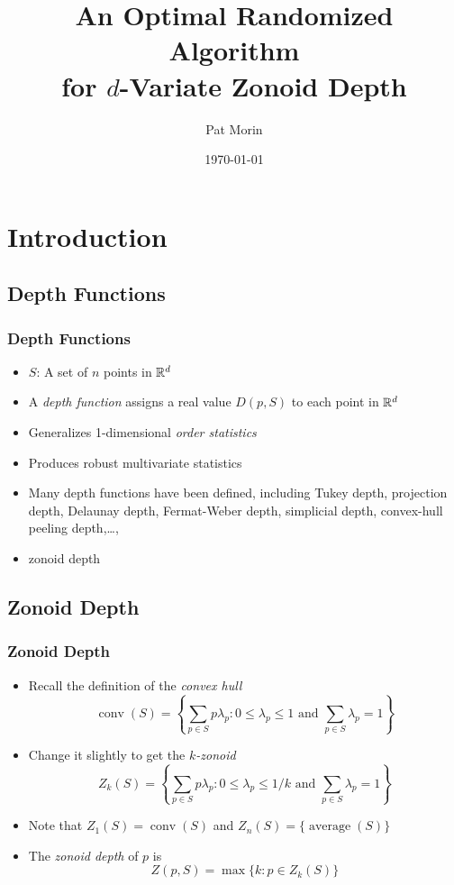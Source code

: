 \documentclass{beamer}
\title{An Optimal Randomized Algorithm \\ for $d$-Variate Zonoid Depth}
\author{Pat Morin}
\date{\today}
\DeclareMathOperator{\conv}{conv}
\DeclareMathOperator{\average}{average}
\begin{document}
\frame{\titlepage}

\section[Outline]{}
\frame{\tableofcontents}

\section{Introduction}
\subsection{Depth Functions}
\frame
{
  \frametitle{Depth Functions}
  \begin{itemize}
  \item $S$: A set of $n$ points in $\mathbb{R}^d$
  \item A \emph{depth function} assigns a real value $D(p,S)$ to 
            each point in $\mathbb{R}^d$
  \item Generalizes 1-dimensional \emph{order statistics} 
  \item Produces robust multivariate statistics
  \item Many depth functions have been defined, including Tukey depth,
projection depth, Delaunay depth, Fermat-Weber depth, simplicial
depth, convex-hull peeling depth,\ldots,
  \item<1->zonoid depth
  \end{itemize}
}
    
\subsection{Zonoid Depth}
\frame
{
   \frametitle{Zonoid Depth}
   \begin{itemize}
   \item<1-> Recall the definition of the \emph{convex hull}
    \[ \conv(S) = \left\{\sum_{p\in S} p\lambda_p : 
         \mbox{$0\le\lambda_p\le 1$ and $\sum_{p\in S}\lambda_p = 1$} 
        \right\} 
    \]
   \item<2-> Change it slightly to get the \emph{$k$-zonoid}
    \[ Z_k(S) = \left\{\sum_{p\in S} p\lambda_p : 
         \mbox{$0\le\lambda_p\le 1/k$ and $\sum_{p\in S}\lambda_p = 1$} 
        \right\} 
    \]
   \item<3-> Note that $Z_1(S)=\conv(S)$ and $Z_n(S)=\{\average(S)\}$ 
   \item<4-> The \emph{zonoid depth} of $p$ is 
     \[ Z(p,S)=\max\{k : p\in Z_k(S)\} \]
   \end{itemize}
}
\end{document}
